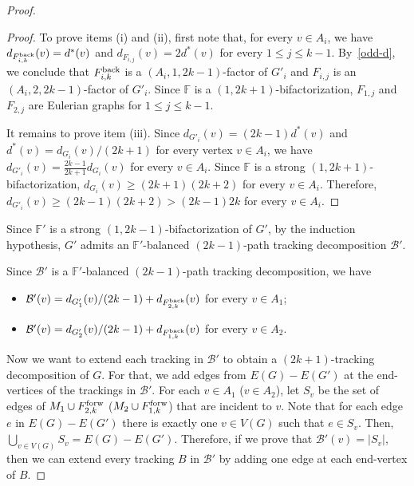 \documentclass[12pt,reqno,a4paper]{amsart}
\def\back{\mathop{\text{\rm back}}\nolimits}
\def\forw{\mathop{\text{\rm forw}}\nolimits}
\newcommand{\B}{\mathcal{B}}
\begin{document}
\begin{proof}
\begin{proof}
To prove items (i) and (ii), first 
note that, for every $v\in A_i$, we have \(d_{F_{i,k}^{\back}}(v) = 
d^*(v)\) and \(d_{F_{i,j}}(v) = 2d^*(v)\) for every \(1\leq 
j\leq k-1\). By~\eqref{odd-d}, we conclude that \(F_{i,k}^{\back}\) is a 
\((A_i,1,2k-1)\)-factor of 
\(G'_i\) and \(F_{i,j}\) is an \((A_i,2,2k-1)\)-factor of \(G'_i\). 
Since \(\mathbb{F}\) is a \((1,2k+1)\)-bifactorization,
\(F_{1,j}\) and \(F_{2,j}\) are Eulerian graphs for 
\(1\leq j\leq k-1\).

It remains to prove item (iii).
Since \(d_{G'_i}(v) = (2k-1)d^*(v)\) and \(d^*(v) = d_{G_i}(v)/(2k+1)\) for 
every vertex \(v\in A_i\),
we have \(d_{G'_i}(v) = \frac{2k-1}{2k+1}d_{G_i}(v)\) for every \(v\in A_i\).
Since \(\mathbb{F}\) is a strong \((1,2k+1)\)-bifactorization, 
\(d_{G_i}(v) \geq (2k+1)(2k+2)\) for every \(v\in A_i\).
Therefore, \(d_{G'_i}(v) \geq (2k-1)(2k+2) > (2k-1)2k\) for every \(v\in 
A_i\).
\end{proof}

Since 
\(\mathbb{F}'\) is a strong \((1,2k-1)\)-bifactorization of \(G'\),
by the induction hypothesis, 
\(G'\) admits an \(\mathbb{F}'\)-balanced $(2k-1)$-path 
tracking decomposition \(\B'\).

Since \(\B'\) is a \(\mathbb{F}'\)-balanced $(2k-1)$-path tracking decomposition, we have
	\begin{itemize}
		\item \(\B'(v) = d_{G'_1}(v)/(2k-1) + d_{F_{2,k}^{\back}}(v)\) 
for every 
\(v\in A_1\);
		\item \(\B'(v) = d_{G'_2}(v)/(2k-1) + d_{F_{1,k}^{\back}}(v)\) 
for every 
\(v\in A_2\).
	\end{itemize}
Now we want to extend each tracking in \(\B'\) to obtain 
a \((2k+1)\)-tracking decomposition of \(G\).
For that, we add edges from  
\(E(G) - E(G')\) at the end-vertices of the trackings in $\B'$.
For each \(v\in A_1\) (\(v\in A_2\)), let \(S_v\) be the set of edges of 
\(M_1\cup F_{2,k}^{\forw}\) (\(M_2\cup F_{1,k}^{\forw}\)) that are incident 
to \(v\).
Note that for each edge \(e\) in \(E(G) - E(G')\) 
there is exactly one \(v\in V(G)\) such that \(e\in S_v\).
Then, \(\bigcup_{v\in V(G)} S_v = E(G) - 
E(G')\).
Therefore, if we prove that \(\B'(v) = |S_v|\), then we can extend every 
tracking $B$ in $\B'$ by adding one edge at each end-vertex of $B$.



\end{proof}
\end{document}

